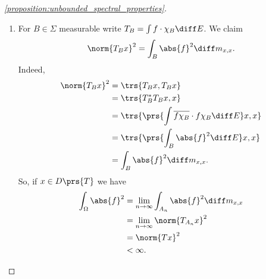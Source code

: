 \documentclass[10pt, twoside]{book}
\begin{document}
\begin{proof}[\ref{proposition:unbounded_spectral_properties}]
\begin{enumerate}
\item%
For $B \in \Sigma$ measurable write $T_B = \int f \cdot \chi_B \diff E$. We claim
\[\norm{T_B x}^2 = \int_B \abs{f}^2 \diff m_{x,x} \text{.}\]
Indeed,
\begin{align*}
\norm{T_B x}^2 &= \trs{T_Bx, T_Bx}
\\&= \trs{T_B^* T_B x, x}
\\&= \trs{\prs{\int \overline{f \chi_B} \cdot f \chi_B \diff E} x, x}
\\&= \trs{\prs{\int_B\abs{f}^2 \diff E}x,x}
\\&= \int_B \abs{f}^2 \diff m_{x,x} \text{.}
\end{align*}
So, if $x \in D\prs{T}$ we have
\begin{align*}
\int_\Omega \abs{f}^2 &= \lim_{n\to\infty} \int_{A_n} \abs{f}^2 \diff m_{x,x}
\\&= \lim_{n\to\infty} \norm{T_{A_n} x}^2
\\&= \norm{Tx}^2
\\&< \infty \text{.}
\end{align*}


\end{enumerate}
\end{proof}
\end{document}

